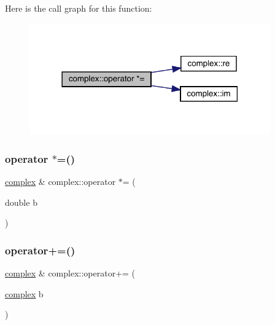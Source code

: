 Here is the call graph for this function\+:
\nopagebreak
\begin{figure}[H]
\begin{center}
\leavevmode
\includegraphics[width=294pt]{classcomplex_a1916e5817cf8faf91347120309e99e59_cgraph}
\end{center}
\end{figure}
\mbox{\label{classcomplex_addc9b5f5da847cd8c3c0e72401ab6513}} 
\subsubsection{\texorpdfstring{operator $\ast$=()}{operator *=()}\hspace{0.1cm}{\footnotesize\ttfamily [2/2]}}
{\footnotesize\ttfamily \mbox{\hyperlink{classcomplex}{complex}} \& complex\+::operator $\ast$= (\begin{DoxyParamCaption}\item[{double}]{b }\end{DoxyParamCaption})}

\mbox{\label{classcomplex_a8430406d485ddd82907b89aa38dfac18}} 
\subsubsection{\texorpdfstring{operator+=()}{operator+=()}\hspace{0.1cm}{\footnotesize\ttfamily [1/2]}}
{\footnotesize\ttfamily \mbox{\hyperlink{classcomplex}{complex}} \& complex\+::operator+= (\begin{DoxyParamCaption}\item[{\mbox{\hyperlink{classcomplex}{complex}}}]{b }\end{DoxyParamCaption})}

